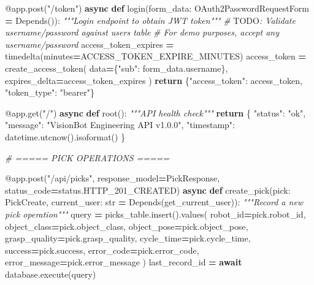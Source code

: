 \documentclass[
]{article}
\newenvironment{Shaded}{\begin{snugshade}}{\end{snugshade}}
\newcommand{\AlertTok}[1]{\textcolor[rgb]{0.94,0.16,0.16}{#1}}
\newcommand{\AttributeTok}[1]{\textcolor[rgb]{0.13,0.29,0.53}{#1}}
\newcommand{\BuiltInTok}[1]{#1}
\newcommand{\CommentTok}[1]{\textcolor[rgb]{0.56,0.35,0.01}{\textit{#1}}}
\newcommand{\ControlFlowTok}[1]{\textcolor[rgb]{0.13,0.29,0.53}{\textbf{#1}}}
\newcommand{\KeywordTok}[1]{\textcolor[rgb]{0.13,0.29,0.53}{\textbf{#1}}}
\newcommand{\NormalTok}[1]{#1}
\newcommand{\OperatorTok}[1]{\textcolor[rgb]{0.81,0.36,0.00}{\textbf{#1}}}
\newcommand{\StringTok}[1]{\textcolor[rgb]{0.31,0.60,0.02}{#1}}
\begin{document}
\begin{Shaded}
\begin{Highlighting}[]
\AttributeTok{@app.post}\NormalTok{(}\StringTok{"/token"}\NormalTok{)}
\ControlFlowTok{async} \KeywordTok{def}\NormalTok{ login(form\_data: OAuth2PasswordRequestForm }\OperatorTok{=}\NormalTok{ Depends()):}
    \CommentTok{"""Login endpoint to obtain JWT token"""}
    \CommentTok{\# }\AlertTok{TODO}\CommentTok{: Validate username/password against users table}
    \CommentTok{\# For demo purposes, accept any username/password}
\NormalTok{    access\_token\_expires }\OperatorTok{=}\NormalTok{ timedelta(minutes}\OperatorTok{=}\NormalTok{ACCESS\_TOKEN\_EXPIRE\_MINUTES)}
\NormalTok{    access\_token }\OperatorTok{=}\NormalTok{ create\_access\_token(}
\NormalTok{        data}\OperatorTok{=}\NormalTok{\{}\StringTok{"sub"}\NormalTok{: form\_data.username\}, expires\_delta}\OperatorTok{=}\NormalTok{access\_token\_expires}
\NormalTok{    )}
    \ControlFlowTok{return}\NormalTok{ \{}\StringTok{"access\_token"}\NormalTok{: access\_token, }\StringTok{"token\_type"}\NormalTok{: }\StringTok{"bearer"}\NormalTok{\}}

\AttributeTok{@app.get}\NormalTok{(}\StringTok{"/"}\NormalTok{)}
\ControlFlowTok{async} \KeywordTok{def}\NormalTok{ root():}
    \CommentTok{"""API health check"""}
    \ControlFlowTok{return}\NormalTok{ \{}
        \StringTok{"status"}\NormalTok{: }\StringTok{"ok"}\NormalTok{,}
        \StringTok{"message"}\NormalTok{: }\StringTok{"VisionBot Engineering API v1.0.0"}\NormalTok{,}
        \StringTok{"timestamp"}\NormalTok{: datetime.utcnow().isoformat()}
\NormalTok{    \}}

\CommentTok{\# ===== PICK OPERATIONS =====}

\AttributeTok{@app.post}\NormalTok{(}\StringTok{"/api/picks"}\NormalTok{, response\_model}\OperatorTok{=}\NormalTok{PickResponse, status\_code}\OperatorTok{=}\NormalTok{status.HTTP\_201\_CREATED)}
\ControlFlowTok{async} \KeywordTok{def}\NormalTok{ create\_pick(pick: PickCreate, current\_user: }\BuiltInTok{str} \OperatorTok{=}\NormalTok{ Depends(get\_current\_user)):}
    \CommentTok{"""Record a new pick operation"""}
\NormalTok{    query }\OperatorTok{=}\NormalTok{ picks\_table.insert().values(}
\NormalTok{        robot\_id}\OperatorTok{=}\NormalTok{pick.robot\_id,}
\NormalTok{        object\_class}\OperatorTok{=}\NormalTok{pick.object\_class,}
\NormalTok{        object\_pose}\OperatorTok{=}\NormalTok{pick.object\_pose,}
\NormalTok{        grasp\_quality}\OperatorTok{=}\NormalTok{pick.grasp\_quality,}
\NormalTok{        cycle\_time}\OperatorTok{=}\NormalTok{pick.cycle\_time,}
\NormalTok{        success}\OperatorTok{=}\NormalTok{pick.success,}
\NormalTok{        error\_code}\OperatorTok{=}\NormalTok{pick.error\_code,}
\NormalTok{        error\_message}\OperatorTok{=}\NormalTok{pick.error\_message}
\NormalTok{    )}
\NormalTok{    last\_record\_id }\OperatorTok{=} \ControlFlowTok{await}\NormalTok{ database.execute(query)}


\end{Highlighting}
\end{Shaded}
\end{document}
